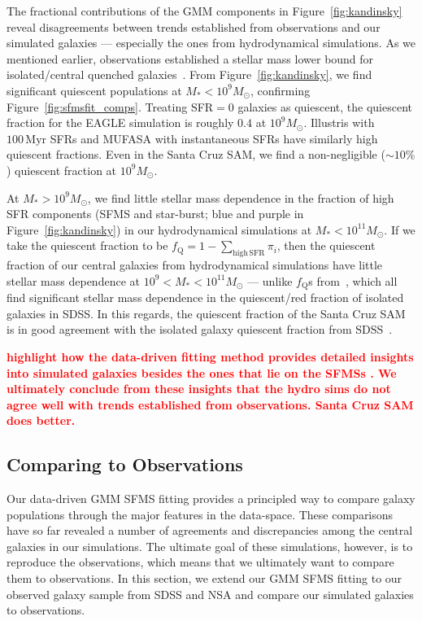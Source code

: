 \documentclass[preprint2,tighten]{aastex62}
\newcommand{\todo}[1]{{\bf \textcolor{red}{ #1}}}
\begin{document}
The fractional contributions of the GMM components in Figure~\ref{fig:kandinsky}
reveal disagreements between trends established from 
observations and our simulated galaxies --- especially the ones from 
hydrodynamical simulations. As we mentioned earlier, observations 
established a stellar mass lower bound for isolated/central quenched
galaxies~\citep{geha2012}. From Figure~\ref{fig:kandinsky}, we find significant quiescent
populations at $M_* < 10^9 M_\odot$, confirming 
Figure~\ref{fig:sfmsfit_comps}. Treating SFR$=0$ galaxies as quiescent, the quiescent 
fraction for the EAGLE simulation is roughly $0.4$ at $10^9M_\odot$. 
Illustris with $100\,\mathrm{Myr}$ SFRs and MUFASA with instantaneous SFRs
have similarly high quiescent fractions. Even in the Santa Cruz SAM, we 
find a non-negligible ($\sim 10\%$) quiescent fraction at $10^9M_\odot$. 

At $M_* > 10^9M_\odot$, we find little stellar mass dependence in the 
fraction of high SFR components (SFMS and star-burst; blue and purple 
in Figure~\ref{fig:kandinsky}) in our hydrodynamical simulations at 
$M_* < 10^{11}M_\odot$. If we take the quiescent fraction to be 
$f_\mathrm{Q} = 1 - \sum\limits_{\mathrm{high\,SFR}} \pi_i$, then the 
quiescent fraction of our central galaxies from hydrodynamical simulations 
have little stellar mass dependence at $10^9 < M_* < 10^{11} M_\odot$ ---
unlike $f_\mathrm{Q}$s from~\cite{baldry2006,peng2010,hahn2015},
which all find significant stellar mass dependence in the quiescent/red fraction of 
isolated galaxies in SDSS. In this regards, the quiescent fraction of the 
Santa Cruz SAM is in good agreement with the isolated galaxy 
quiescent fraction from SDSS~\citep{baldry2006,peng2010,hahn2015}.

\todo{highlight how the data-driven fitting method provides detailed insights into 
simulated galaxies besides the ones that lie on the SFMSs .
We ultimately conclude from these insights that the hydro sims do not agree
well with trends established from observations. Santa Cruz SAM does better.}

\subsection{Comparing to Observations}
Our data-driven GMM SFMS fitting provides a principled way to compare 
galaxy populations through the major features in the data-space. These 
comparisons have so far revealed a number of agreements and discrepancies
among the central galaxies in our simulations. The ultimate goal of 
these simulations, however, is to reproduce the observations, which means
that we ultimately want to compare them to observations. In this section, 
we extend our GMM SFMS fitting to our observed galaxy sample from SDSS and NSA
and compare our simulated galaxies to observations.
\end{document}
